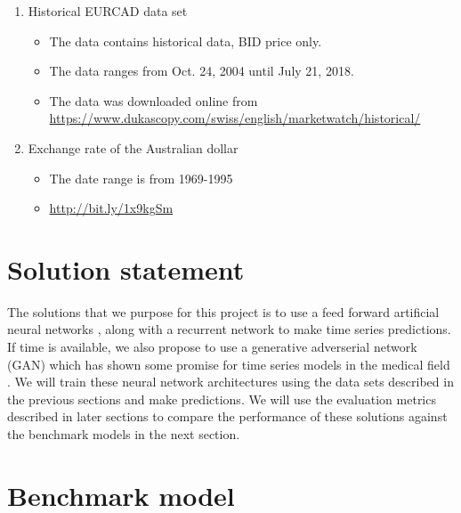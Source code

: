 \documentclass[10pt,a4paper]{article}
\begin{document}
\begin{enumerate}
         \item Historical EURCAD data set
   \begin{itemize}
     \item The data contains historical data, BID price only.
     \item The data ranges from Oct. 24, 2004 until July 21, 2018.
     \item The data was downloaded online from\\ \url{https://www.dukascopy.com/swiss/english/marketwatch/historical/}
   \end{itemize}   
   
   \item Exchange rate of the Australian dollar 
   \begin{itemize}
   \item The date range is from 1969-1995
   \item \url{http://bit.ly/1x9kgSm}
   \end{itemize}
\end{enumerate}


\section{Solution statement}



The solutions that we purpose for this project is to use a feed forward artificial neural networks \cite{Chaudhuri_2016}, along with a recurrent network \cite{Pant_2018} to make time series predictions. If time is available, we also propose to use a generative adverserial network (GAN) which has shown some promise for time series models in the medical field \cite{Esteban_2017}. We will train these neural network architectures using the data sets described in the previous sections and make predictions. We will use the evaluation metrics described in later sections to compare the performance of these solutions against the benchmark models in the next section.



\section{Benchmark model}
\end{document}
